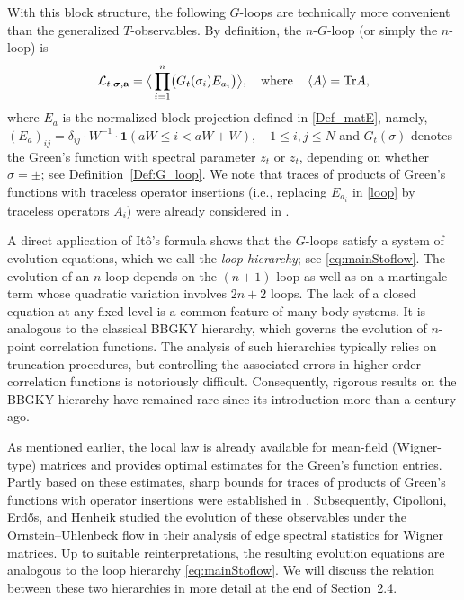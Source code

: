 \documentclass[10pt,reqno]{article}
\renewcommand{\bar}{\overline}
\theoremstyle{plain} %
\theoremstyle{remark}
\numberwithin{equation}{section}
\begin{document}
With this block structure, the following \(G\)-loops are technically more convenient than the generalized \(T\)-observables. By definition, the \(n\)-\(G\)-loop (or simply the \(n\)-loop) is
\begin{align}\label{loop}
{\cal L}_{t, \boldsymbol{\sigma}, \textbf{a}} = \big \langle \prod_{i=1}^n \bigl(G_t(\sigma_i)E_{a_i}\bigr) \big\rangle, \quad \text{where} \quad \left\langle A \right\rangle = \text{Tr} A,
\end{align}
where \(E_a\) is the normalized block projection defined in \eqref{Def_matE},  namely,  $(E_a)_{ij}=  \delta_{ij}\cdot W^{-1}\cdot\textbf{1}(aW\le i<aW+W),\quad 1\le i,j\le N$ and \(G_t(\sigma)\) denotes the Green's function with spectral parameter \(z_t\) or \(\bar z_t\), depending on whether \(\sigma=\pm\); see Definition~\ref{Def:G_loop}. We note that traces of products of Green's functions with traceless operator insertions (i.e., replacing \(E_{a_i}\) in \eqref{loop} by traceless operators \(A_i\)) were already considered in
\cite{CipolloniErdosSchroder2022OptimalMultiResolvent,CipolloniErdosSchroder2022RankUniform}.

A direct application of It\^o's formula shows that the \(G\)-loops satisfy a system of evolution equations, which we call the \emph{loop hierarchy}; see \eqref{eq:mainStoflow}. The evolution of an \(n\)-loop depends on the \((n+1)\)-loop as well as on a martingale term whose quadratic variation involves \(2n+2\) loops. The lack of a closed equation at any fixed level is a common feature of many-body systems. It is analogous to the classical BBGKY hierarchy, which governs the evolution of \(n\)-point correlation functions. The analysis of such hierarchies typically relies on truncation procedures, but controlling the associated errors in higher-order correlation functions is notoriously difficult. Consequently, rigorous results on the BBGKY hierarchy have remained rare since its introduction more than a century ago.

As mentioned earlier, the local law is already available for mean-field (Wigner-type) matrices and provides optimal estimates for the Green's function entries. Partly based on these estimates,  
sharp bounds for traces of products of Green's functions with operator insertions were established in \cite{CipolloniErdosSchroder2022OptimalMultiResolvent,CipolloniErdosSchroder2022RankUniform}.  
Subsequently, Cipolloni, Erd\H{o}s, and Henheik
\cite{CipolloniErdosHenheik2023EdgeETH}
studied the evolution of these observables under the Ornstein--Uhlenbeck flow in their analysis of edge spectral statistics for Wigner matrices. Up to suitable reinterpretations, the resulting evolution equations are analogous to the loop hierarchy \eqref{eq:mainStoflow}. We will discuss the relation between these two hierarchies in more detail at the end of Section~2.4.
\end{document}
